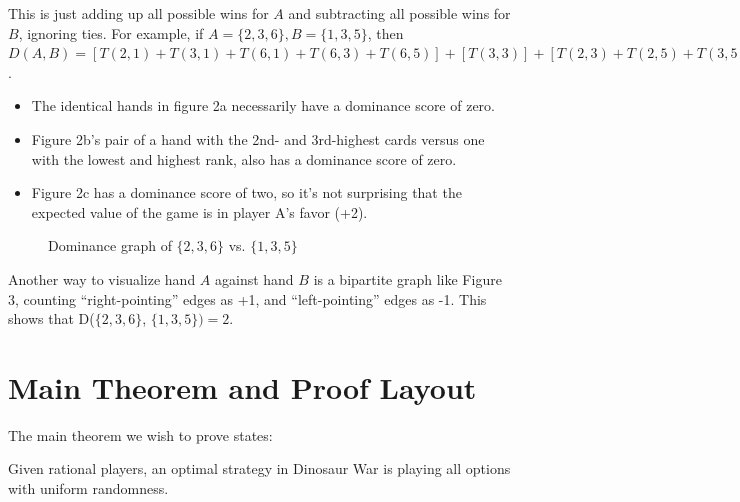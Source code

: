 \documentclass[11pt, oneside]{article} 	%
\begin{document}
This is just adding up all possible wins for $A$ and subtracting all possible wins for $B$, ignoring ties. For example, if $A = \{2, 3,6\}, B = \{1,3,5\}$, then $D(A,B) = [T(2,1) + T(3,1) + T(6,1) + T(6,3) + T(6,5)] + [T(3,3)] +  [T(2,3) + T(2,5) + T(3,5)] = 5 + 0 - 3 = 2$.


\begin{itemize}
\item The identical hands in figure 2a necessarily have a dominance score of zero.
\item Figure 2b's pair of a hand with the 2nd- and 3rd-highest cards versus one with the lowest and highest rank, also has a dominance score of zero.
\item Figure 2c has a dominance score of two, so it's not surprising that the expected value of the game is in player A's favor (+2).
\end{itemize}


\begin{figure}
\centering
{}
\label{fig:bipartite}
\caption{Dominance graph of $\{2,3,6\}$ vs. $\{1,3,5\}$}
\end{figure}

Another way to visualize hand $A$ against hand $B$ is a bipartite graph like Figure 3, counting ``right-pointing'' edges as +1, and ``left-pointing'' edges as -1. This shows that D($\{2,3,6\}$, $\{1,3,5\}) = 2$.



\section{Main Theorem and Proof Layout}

The main theorem we wish to prove states:

\begin{framed}
Given rational players, an optimal strategy in Dinosaur War is playing all options with uniform randomness.
\end{framed}
\end{document}
